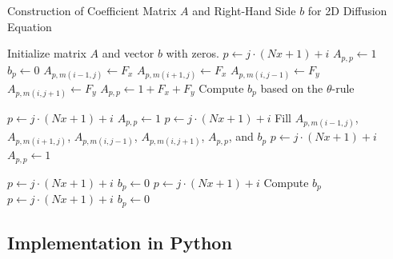 \documentclass{article}
\begin{document}
			\begin{algorithm}
				\caption{Construction of Coefficient Matrix $A$ and Right-Hand Side $b$ for 2D Diffusion Equation}
				\begin{algorithmic}[1]
					\State Initialize matrix $A$ and vector $b$ with zeros.
					\State $p \gets j \cdot (Nx + 1) + i$ 
					\State $A_{p, p} \gets 1$
					\State $b_p \gets 0$
					\Else
					\State {}
					\State $A_{p, m(i-1, j)} \gets F_x$
					\State $A_{p, m(i+1, j)} \gets F_x$
					\State $A_{p, m(i, j-1)} \gets F_y$
					\State $A_{p, m(i, j+1)} \gets F_y$
					\State $A_{p, p} \gets 1 + F_x + F_y$
					\State Compute $b_p$ based on the $\theta$-rule
					\EndIf
					\EndFor
					\EndFor
					
					\State {}
					\State $p \gets j \cdot (Nx + 1) + i$
					\State $A_{p, p} \gets 1$
					\EndFor
					\State {}
					\State $p \gets j \cdot (Nx + 1) + i$
					\State Fill $A_{p, m(i-1, j)}$, $A_{p, m(i+1, j)}$, $A_{p, m(i, j-1)}$, $A_{p, m(i, j+1)}$, $A_{p, p}$, and $b_p$
					\EndFor
					\State {}
					\State $p \gets j \cdot (Nx + 1) + i$
					\State $A_{p, p} \gets 1$
					\EndFor
					\EndFor
					
					\State {}
					\State $p \gets j \cdot (Nx + 1) + i$
					\State $b_p \gets 0$
					\EndFor
					\State {}
					\State $p \gets j \cdot (Nx + 1) + i$
					\State Compute $b_p$
					\EndFor
					\State {}
					\State $p \gets j \cdot (Nx + 1) + i$
					\State $b_p \gets 0$
					\EndFor
					\EndFor
					
				\end{algorithmic}
			\end{algorithm}
		\newpage
		
		\subsection{Implementation in Python}
		
\end{document}
